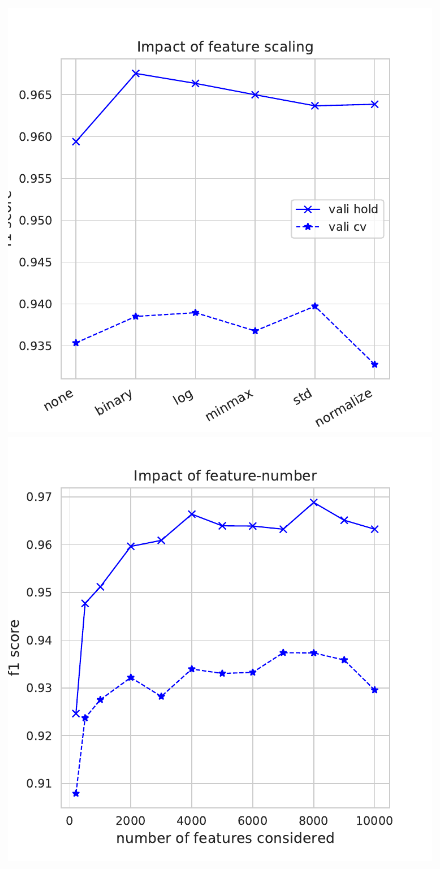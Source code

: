 \documentclass[11pt]{article}
\begin{document}
\begin{figure}
\begin{minipage}[l]{0.3\textwidth}
\includegraphics[width=1\linewidth]{email_spam/rnd_scaling.pdf}
\end{minipage}
\begin{minipage}[l]{0.3\textwidth}
\includegraphics[width=1\linewidth]{email_spam/rnd_features.pdf}

\end{minipage}
\end{figure}
\end{document}
